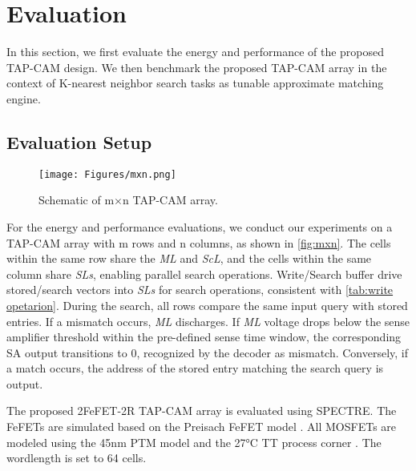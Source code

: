 

\section{Evaluation}
\label{sec:eval}
In this section, we first evaluate the energy and performance of the proposed TAP-CAM design. We then benchmark the proposed TAP-CAM array in the context of K-nearest neighbor search tasks as tunable approximate matching engine.

\subsection{Evaluation Setup}

\begin{figure}
    \centering
    \texttt{[image: Figures/mxn.png]}
    \caption{Schematic of m$\times$n TAP-CAM array.}
\label{fig:mxn}
\end{figure}

For the energy and performance evaluations, we conduct our experiments on
a TAP-CAM array with m rows and n columns, as shown in \autoref{fig:mxn}. 
The cells within the same row share the \textit{ML} and \textit{ScL}, and %
the cells within the same column share \textit{SLs}, enabling parallel search operations. 
Write/Search buffer drive stored/search vectors into \textit{SLs} for search operations, consistent with \autoref{tab:write opetarion}. 
During the search, all rows compare the same input query with stored entries.
If a mismatch occurs, \textit{ML} discharges. 
If \textit{ML} voltage drops below the sense amplifier threshold within the pre-defined sense time window, the corresponding SA output transitions to 0, recognized by the decoder as mismatch. Conversely, if a match occurs, the address of the stored entry matching the search query is output.

The proposed 2FeFET-2R TAP-CAM array is evaluated using SPECTRE. The FeFETs are simulated based on the Preisach FeFET model \cite{transfer-characteristics}.
All MOSFETs are modeled using the 45nm PTM model and the 27°C TT process corner \cite{evaluation2}. The wordlength is set to 64 cells.

